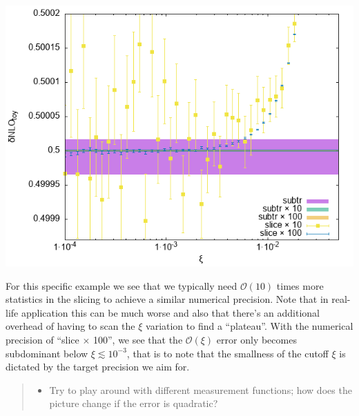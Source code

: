 \documentclass[11pt]{article}
\begin{document}
\begin{center}
\includegraphics[width=.9\linewidth]{data_zoom.png}
\end{center}
For this specific example we see that we typically need \(\mathcal{O}(10)\) times more statistics in the slicing to achieve a similar numerical precision.
Note that in real-life application this can be much worse and also that there's an additional overhead of having to scan the \(\xi\) variation to find a ``plateau''.
With the numerical precision of ``slice \(\times\) 100'', we see that the \(\mathcal{O}(\xi)\) error only becomes subdominant below \(\xi \lesssim 10^{-3}\), that is to note that the smallness of the cutoff \(\xi\) is dictated by the target precision we aim for.

\begin{quote}
\begin{itemize}
\item Try to play around with different measurement functions; how does the picture change if the error is quadratic?
\end{itemize}
\end{quote}
\end{document}
